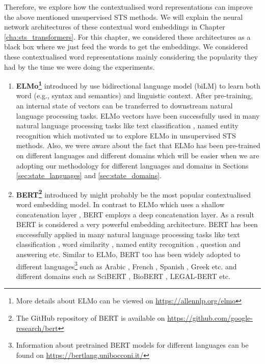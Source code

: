  
Therefore, we explore how the contextualised word representations can improve the above mentioned unsupervised STS methods. We will explain the neural network architectures of these contextual word embeddings in Chapter \ref{cha:sts_transformers}. For this chapter, we considered these architectures as a black box where we just feed the words to get the embeddings. We considered these contextualised word representations mainly considering the popularity they had by the time we were doing the experiments.

\begin{enumerate}
\item \textbf{ELMo\footnote{More details about ELMo can be viewed on \url{https://allennlp.org/elmo}}}
introduced by \citet{peters-etal-2018-deep} use bidirectional language model (biLM) to learn both word (e.g., syntax and semantics) and linguistic context. After pre-training, an internal state of vectors can be transferred to downstream natural language processing tasks. ELMo vectors have been successfully used in many natural language processing tasks like text classification \cite{jiang-etal-2019-team}, named entity recognition \cite{Luo2018} which motivated us to explore ELMo in unsupervised STS methods. Also, we were aware about the fact that ELMo has been pre-trained on different languages \cite{che-EtAl:2018:K18-2} and different domains \cite{jin2019probing} which will be easier when we are adopting our methodology for different languages and domains in Sections \ref{sec:state_languages} and \ref{sec:state_domains}.

\item \textbf{BERT\footnote{The GitHub repository of BERT is available on \url{https://github.com/google-research/bert}}} introduced by \citet{devlin-etal-2019-bert} might probably be the most popular contextualised word embedding model. In contrast to ELMo which uses a shallow concatenation layer \cite{devlin-etal-2019-bert}, BERT employs a deep concatenation layer. As a result BERT is considered a very powerful embedding architecture. BERT has been successfully applied in many natural language processing tasks like text classification \cite{Ranasinghe2019a}, word similarity \cite{hettiarachchi-etal-2020-brums}, named entity recognition \cite{10.1145/3394486.3403149}, question and answering \cite{yang-etal-2019-end} etc. Similar to ELMo, BERT too has been widely adopted to different languages\footnote{Information about pretrained BERT models for different languages can be found on \url{https://bertlang.unibocconi.it/}} such as Arabic \cite{antoun-etal-2020-arabert}, French \cite{martin-etal-2020-camembert}, Spanish \cite{CaneteCFP2020}, Greek \cite{10.1145/3411408.3411440} etc. and different domains such as SciBERT \cite{beltagy-etal-2019-scibert}, BioBERT \cite{10.1093/bioinformatics/btz682}, LEGAL-BERT \cite{chalkidis-etal-2020-legal} etc.  


\end{enumerate}
